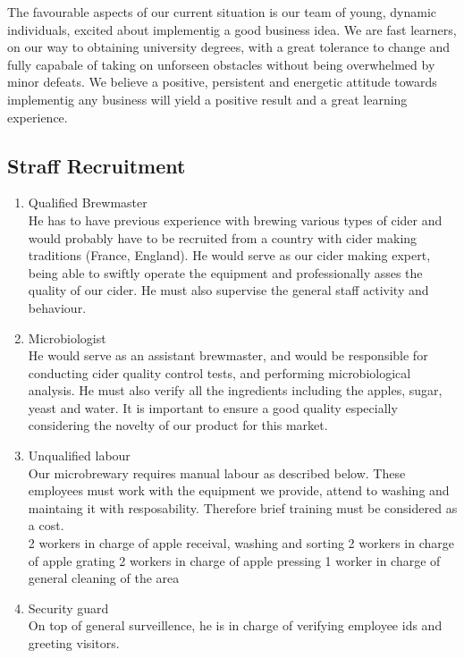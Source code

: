 \documentclass[11pt]{article}
\begin{document}
\noindent The favourable aspects of our current situation is our team of young, dynamic individuals, excited about implementig a good business idea. We are fast learners, on our way to obtaining university degrees, with a great tolerance to change and fully capabale of taking on unforseen obstacles without being overwhelmed by minor defeats. We believe a positive, persistent and energetic attitude towards implementig any business will yield a positive result and a great learning experience.

  \subsection{Straff Recruitment}


  \begin{enumerate}
  \item Qualified Brewmaster \\
He has to have previous experience with brewing various types of cider and would probably have to be recruited from a country with cider making traditions (France, England). He would serve as our cider making expert, being able to swiftly operate the equipment and professionally asses the quality of our cider. He must also supervise the general staff activity and behaviour.

  \item Microbiologist \\
He would serve as an assistant brewmaster, and would be responsible for conducting cider quality control tests, and performing microbiological analysis. He must also verify all the ingredients including the apples, sugar, yeast and water.
It is important to ensure a good quality especially considering the novelty of our product for this market.

  \item Unqualified labour \\
Our microbrewary requires manual labour as described below. These employees must work with the equipment we provide, attend to washing and maintaing it with resposability. Therefore brief training must be considered as a cost. \\ 
  2 workers in charge of apple receival, washing and sorting
  2 workers in charge of apple grating
  2 workers in charge of apple pressing
  1 worker in charge of general cleaning of the area

  \item Security guard \\
On top of general surveillence, he is in charge of verifying employee ids and greeting visitors.
  \end{enumerate}
\end{document}
